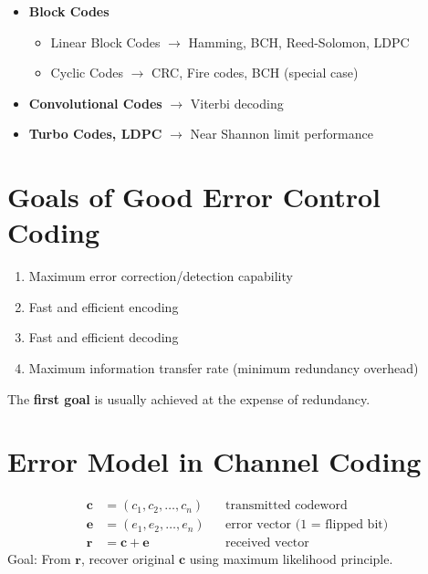 \documentclass[11pt,a4paper]{book}
\newenvironment{formulabox}[1][Formula]{
    \begin{tcolorbox}[
        enhanced,
        breakable,
        colback=softcoral!10,
        colframe=softcoral!200,
        title=#1,
        fonttitle=\bfseries,
        coltitle=white,
        sharp corners,
        boxrule=1pt,
        left=8pt,
        right=8pt,
        top=6pt,
        bottom=6pt
    ]
}{
    \end{tcolorbox}
}
\newenvironment{infobox}[1][Information]{
    \begin{tcolorbox}[
        enhanced,
        breakable,
        colback=mintgreen!10,
        colframe=mintgreen!200,
        title=#1,
        fonttitle=\bfseries,
        sharp corners,
        boxrule=0.8pt,
        left=8pt,
        right=8pt,
        top=6pt,
        bottom=6pt
    ]
}{
    \end{tcolorbox}
}
\begin{document}
\begin{center}
    \begin{tcolorbox}[enhanced, breakable, colback=mintgreen!10, colframe=mintgreen!200, title=\textbf{Classification of Channel Codes}]
        \begin{itemize}
            \item[] \textbf{Block Codes}
                  \begin{itemize}
                      \item Linear Block Codes $\to$ Hamming, BCH, Reed-Solomon, LDPC
                      \item Cyclic Codes $\to$ CRC, Fire codes, BCH (special case)
                  \end{itemize}
            \item[] \textbf{Convolutional Codes} $\to$ Viterbi decoding
            \item[] \textbf{Turbo Codes, LDPC} $\to$ Near Shannon limit performance
        \end{itemize}
    \end{tcolorbox}
\end{center}

\section{Goals of Good Error Control Coding}

\begin{infobox}[Objectives of Error Control Coding]
    \begin{enumerate}
        \item Maximum error correction/detection capability
        \item Fast and efficient encoding
        \item Fast and efficient decoding
        \item Maximum information transfer rate (minimum redundancy overhead)
    \end{enumerate}
    The \textbf{first goal} is usually achieved at the expense of redundancy.
\end{infobox}

\section{Error Model in Channel Coding}

\begin{formulabox}[Channel Model]
    \begin{align*}
        \mathbf{c} & = (c_1, c_2, \dots, c_n)  &  & \text{transmitted codeword}           \\
        \mathbf{e} & = (e_1, e_2, \dots, e_n)  &  & \text{error vector (1 = flipped bit)} \\
        \mathbf{r} & = \mathbf{c} + \mathbf{e} &  & \text{received vector}
    \end{align*}
    Goal: From $\mathbf{r}$, recover original $\mathbf{c}$ using maximum likelihood principle.
\end{formulabox}
\end{document}
